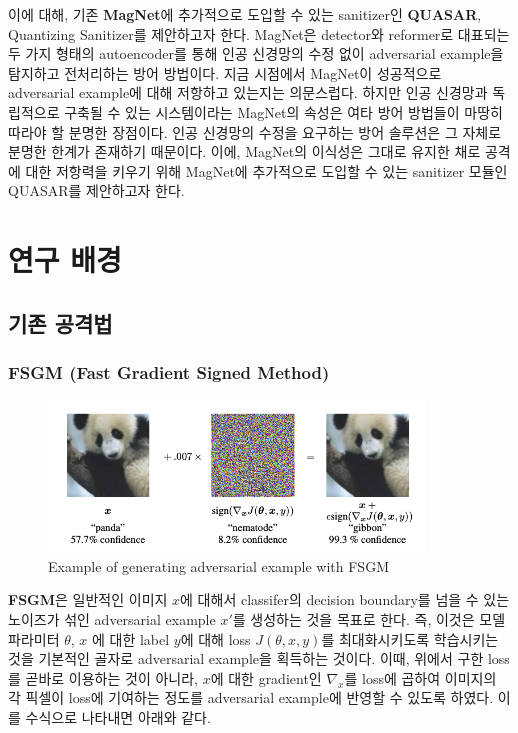 \documentclass{article}
\begin{document}
이에 대해, 기존 \textbf{MagNet}에 추가적으로 도입할 수 있는 sanitizer인 \textbf{QUASAR}, Quantizing Sanitizer를 제안하고자 한다. MagNet은 detector와 reformer로 대표되는 두 가지 형태의 autoencoder를 통해 인공 신경망의 수정 없이 adversarial example을 탐지하고 전처리하는 방어 방법이다. 지금 시점에서 MagNet이 성공적으로 adversarial example에 대해 저항하고 있는지는 의문스럽다. \cite{carlini2017magnet} 하지만 인공 신경망과 독립적으로 구축될 수 있는 시스템이라는 MagNet의 속성은 여타 방어 방법들이 마땅히 따라야 할 분명한 장점이다. 인공 신경망의 수정을 요구하는 방어 솔루션은 그 자체로 분명한 한계가 존재하기 때문이다. 이에, MagNet의 이식성은 그대로 유지한 채로 공격에 대한 저항력을 키우기 위해 MagNet에 추가적으로 도입할 수 있는 sanitizer 모듈인 QUASAR를 제안하고자 한다.  
 
\section{연구 배경}

\subsection{기존 공격법}


\subsubsection{FSGM (Fast Gradient Signed Method)}

\begin{figure}[h]
    \centering
    \includegraphics[width=10cm]{images/adversarial-example.png}
    \caption{Example of generating adversarial example with FSGM \cite{goodfellow2014explaining}}
\end{figure}

\textbf{FSGM}은 일반적인 이미지 $x$에 대해서 classifer의 decision boundary를 넘을 수 있는 노이즈가 섞인 adversarial example $x'$를 생성하는 것을 목표로 한다. 즉, 이것은 모델 파라미터 $\theta$, $x$ 에 대한 label $y$에 대해 loss $J(\theta, x, y)$를 최대화시키도록 학습시키는 것을 기본적인 골자로 adversarial example을 획득하는 것이다. 이때, 위에서 구한 loss를 곧바로 이용하는 것이 아니라, $x$에 대한 gradient인 $\nabla_x$를 loss에 곱하여 이미지의 각 픽셀이 loss에 기여하는 정도를 adversarial example에 반영할 수 있도록 하였다. 이를 수식으로 나타내면 아래와 같다. \cite{goodfellow2014explaining}
\end{document}
